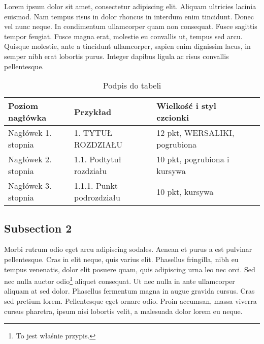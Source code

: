 Lorem ipsum dolor sit amet, consectetur adipiscing elit. Aliquam ultricies lacinia euismod. Nam tempus risus in dolor rhoncus in interdum enim tincidunt. Donec vel nunc neque. In condimentum ullamcorper quam \cite{pozar} non consequat. Fusce sagittis tempor feugiat. Fusce magna erat, molestie eu convallis ut, tempus sed arcu. Quisque molestie, ante a tincidunt ullamcorper, sapien enim dignissim lacus, in semper nibh erat lobortis purus. Integer dapibus ligula ac risus convallis pellentesque.

\begin{table}[ht]
\centering
\caption{Podpis do tabeli}
\label{Tab1}
\small
\begin{tabularx}{\textwidth}{ |X|X|X|X| }
\hline
Poziom nagłówka & Przykład & Wielkość i styl czcionki \\
  \hline
Nagłówek 1. stopnia	& 1. TYTUŁ ROZDZIAŁU & 12 pkt, WERSALIKI, pogrubiona \\
\hline
Nagłówek 2. stopnia & 1.1. Podtytuł rozdziału & 10 pkt, pogrubiona i kursywa \\
\hline
Nagłówek 3. stopnia & 1.1.1. Punkt podrozdziału & 10 pkt, kursywa \\
\hline
\end{tabularx}
\end{table}


\subsection{Subsection 2}
Morbi rutrum odio eget arcu adipiscing sodales. Aenean et purus a est pulvinar pellentesque. Cras in elit neque, quis varius elit. Phasellus fringilla, nibh eu tempus venenatis, dolor elit posuere quam, quis adipiscing urna leo nec orci. Sed nec nulla auctor odio\footnote{To jest właśnie
przypis.} aliquet consequat. Ut nec nulla in ante ullamcorper aliquam at sed dolor. Phasellus fermentum magna in augue gravida cursus. Cras sed pretium lorem. Pellentesque eget ornare odio. Proin accumsan, massa viverra cursus pharetra, ipsum nisi lobortis \cite{mwave} velit, a malesuada dolor lorem eu neque.


